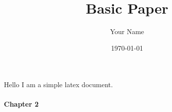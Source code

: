 \documentclass{article}  %
\title{Basic Paper}
\author{Your Name}
\date{\today}
\begin{document}
\maketitle
\newpage
\thispagestyle{fancy}
\section*{}
\paragraph{}
Hello I am a simple latex document.
\lipsum[1]
\paragraph{}
\lipsum[2]
\paragraph*{Chapter 2}
\lipsum[3]
\end{document}
